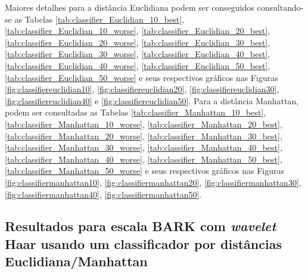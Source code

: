 		\par Maiores detalhes para a distância Euclidiana podem ser conseguidos consultando-se as Tabelas \ref{tab:classifier_Euclidian_10_best}, \ref{tab:classifier_Euclidian_10_worse},
		\ref{tab:classifier_Euclidian_20_best}, \ref{tab:classifier_Euclidian_20_worse}, 
		\ref{tab:classifier_Euclidian_30_best}, \ref{tab:classifier_Euclidian_30_worse}, 
		\ref{tab:classifier_Euclidian_40_best}, \ref{tab:classifier_Euclidian_40_worse}, 
		\ref{tab:classifier_Euclidian_50_best}, \ref{tab:classifier_Euclidian_50_worse}
		e seus respectivos gráficos nas Figuras \ref{fig:classifiereuclidian10}, \ref{fig:classifiereuclidian20}, \ref{fig:classifiereuclidian30}, \ref{fig:classifiereuclidian40} e \ref{fig:classifiereuclidian50}. Para a distância Manhattan, podem ser consultadas as Tabelas 	\ref{tab:classifier_Manhattan_10_best}, \ref{tab:classifier_Manhattan_10_worse}, 
		\ref{tab:classifier_Manhattan_20_best}, \ref{tab:classifier_Manhattan_20_worse}, 
		\ref{tab:classifier_Manhattan_30_best}, \ref{tab:classifier_Manhattan_30_worse}, 
		\ref{tab:classifier_Manhattan_40_best}, \ref{tab:classifier_Manhattan_40_worse}, 
		\ref{tab:classifier_Manhattan_50_best}, \ref{tab:classifier_Manhattan_50_worse} 
		e seus respectivos gráficos nas Figuras		 
		\ref{fig:classifiermanhattan10}, \ref{fig:classifiermanhattan20}, 	 \ref{fig:classifiermanhattan30}, \ref{fig:classifiermanhattan40},  \ref{fig:classifiermanhattan50}.
		
		
		
		\subsection{Resultados para escala BARK com \textit{wavelet} Haar usando um classificador por distâncias Euclidiana/Manhattan}
			
			\vspace{-.7cm}
			
			
			
			
			

			
			
			
			
			
			

